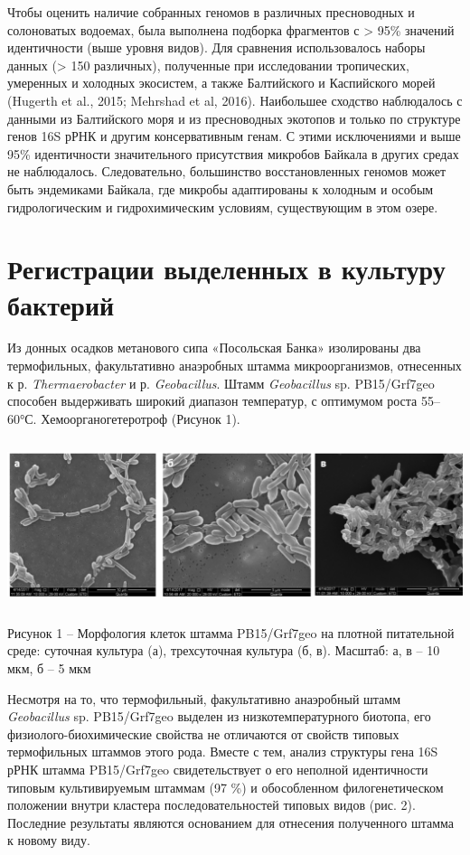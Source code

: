 \documentclass[a4paper,12pt,openany,final]{extreport}
\begin{document}
Чтобы оценить наличие собранных геномов в различных пресноводных и
солоноватых водоемах, была выполнена подборка фрагментов с
\textgreater{} 95\% значений идентичности (выше уровня видов). Для
сравнения использовалось наборы данных (\textgreater{} 150 различных),
полученные при исследовании тропических, умеренных и холодных экосистем,
а также Балтийского и Каспийского морей (Hugerth et al., 2015; Mehrshad
et al, 2016). Наибольшее сходство наблюдалось с данными из Балтийского
моря и из пресноводных экотопов и только по структуре генов 16S рРНК и
другим консервативным генам. С этими исключениями и выше 95\%
идентичности значительного присутствия микробов Байкала в других средах
не наблюдалось. Следовательно, большинство восстановленных геномов может
быть эндемиками Байкала, где микробы адаптированы к холодным и особым
гидрологическим и гидрохимическим условиям, существующим в этом озере.

\chapter{Регистрации выделенных в культуру бактерий}\label{chap:4}

Из донных осадков метанового сипа «Посольская Банка» изолированы два
термофильных, факультативно анаэробных штамма микроорганизмов,
отнесенных к р. \emph{Thermaerobacter} и р. \emph{Geobacillus}. Штамм
\emph{Geobacillus} sp. PB15/Grf7geo способен выдерживать широкий
диапазон температур, с оптимумом роста 55--60°С. Хемоорганогетеротроф
(Рисунок 1).

\includegraphics[width=6.06944in,height=1.92569in]{media/image12.png}

Рисунок 1 -- Морфология клеток штамма PB15/Grf7geo на плотной
питательной среде: суточная культура (а), трехсуточная культура (б, в).
Масштаб: а, в -- 10 мкм, б -- 5 мкм

Несмотря на то, что термофильный, факультативно анаэробный штамм
\emph{Geobacillus} sp. PB15/Grf7geo выделен из низкотемпературного
биотопа, его физиолого-биохимические свойства не отличаются от свойств
типовых термофильных штаммов этого рода. Вместе с тем, анализ структуры
гена 16S рРНК штамма PB15/Grf7geo свидетельствует о его неполной
идентичности типовым культивируемым штаммам (97 \%) и обособленном
филогенетическом положении внутри кластера последовательностей типовых
видов (рис. 2). Последние результаты являются основанием для отнесения
полученного штамма к новому виду.
\end{document}
